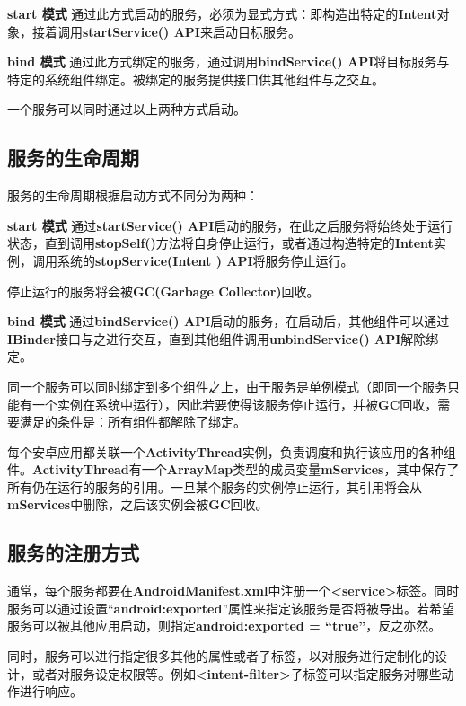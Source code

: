 \textbf{start 模式 } 通过此方式启动的服务，必须为显式方式：即构造出特定的\textbf{Intent}对象，接着调用\textbf{startService() API}来启动目标服务。

\textbf{bind 模式 } 通过此方式绑定的服务，通过调用\textbf{bindService() API}将目标服务与特定的系统组件绑定。被绑定的服务提供接口供其他组件与之交互。

一个服务可以同时通过以上两种方式启动。

\subsection{服务的生命周期}
服务的生命周期根据启动方式不同分为两种\cite{service}：

\textbf{start 模式 } 通过\textbf{startService() API}启动的服务，在此之后服务将始终处于运行状态，直到调用\textbf{stopSelf()}方法将自身停止运行，或者通过构造特定的\textbf{Intent}实例，调用系统的\textbf{stopService(Intent ) API}将服务停止运行。

停止运行的服务将会被\textbf{GC(Garbage Collector)}回收。

\textbf{bind 模式 } 通过\textbf{bindService() API}启动的服务，在启动后，其他组件可以通过\textbf{IBinder}接口与之进行交互，直到其他组件调用\textbf{unbindService() API}解除绑定。

同一个服务可以同时绑定到多个组件之上，由于服务是单例模式（即同一个服务只能有一个实例在系统中运行），因此若要使得该服务停止运行，并被\textbf{GC}回收，需要满足的条件是：所有组件都解除了绑定。

每个安卓应用都关联一个\textbf{ActivityThread}实例，负责调度和执行该应用的各种组件。\textbf{ActivityThread}有一个\textbf{ArrayMap}类型的成员变量\textbf{mServices}，其中保存了所有仍在运行的服务的引用。一旦某个服务的实例停止运行，其引用将会从\textbf{mServices}中删除，之后该实例会被\textbf{GC}回收。

\subsection{服务的注册方式}

通常，每个服务都要在\textbf{AndroidManifest.xml}中注册一个\textbf{<service>}标签。同时服务可以通过设置“\textbf{android:exported}”属性来指定该服务是否将被导出。若希望服务可以被其他应用启动，则指定\textbf{android:exported = “true”}，反之亦然。

同时，服务可以进行指定很多其他的属性或者子标签，以对服务进行定制化的设计，或者对服务设定权限等。例如\textbf{<intent-filter>}子标签可以指定服务对哪些动作进行响应。
